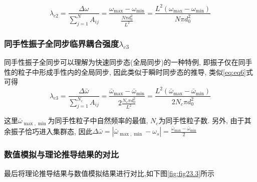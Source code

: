 \documentclass{article}
\begin{document}
\begin{equation}\label{eq:eq6}
	\lambda _{c2}=\frac{\Delta \omega}{\sum_{j=1}^N{A_{ij}}}=\frac{\omega _{\max}-\omega _{\min}}{\frac{N\pi d_{0}^{2}}{L^2}}=\frac{L^2\left( \omega _{\max}-\omega _{\min} \right)}{N\pi d_{0}^{2}}
\end{equation}

\subsubsection{同手性振子全同步临界耦合强度$\lambda_{c3}$}

同手性振子全同步可以理解为快速同步态(全局同步)的一种特例, 即振子仅在同手性的粒子中形成手性内的全局同步, 因此类似于瞬时同步态的推导, 类似\ref{eq:eq6}式可得
\vspace{-0.1cm}
$$
\lambda _{c3}=\frac{\Delta \bar{\omega}}{\sum_{j=1}^{N_c}{A_{ij}}}=\frac{\bar{\omega}_{\max}-\bar{\omega}_{\min}}{2\frac{N_c\pi d_{0}^{2}}{L^2}}=\frac{L^2\left( \bar{\omega}_{\max}-\bar{\omega}_{\min} \right)}{2N_c\pi d_{0}^{2}}
$$

\noindent 这里$\bar{\omega}_{\max, \min}$为同手性粒子中自然频率的最值, $N_c$为同手性粒子数. 另外, 由于其余振子恰巧进入集群态, 因此$\Delta \bar{\omega}=\left| \bar{\omega}_{\max ,\min}-\omega _s \right|=\frac{\bar{\omega}_{\max}-\bar{\omega}_{\min}}{2}
$
\vspace{-0.1cm}

\subsubsection{数值模拟与理论推导结果的对比}

最后将理论推导结果与数值模拟结果进行对比,如下图\ref{fig:fig23.3}所示
\end{document}
